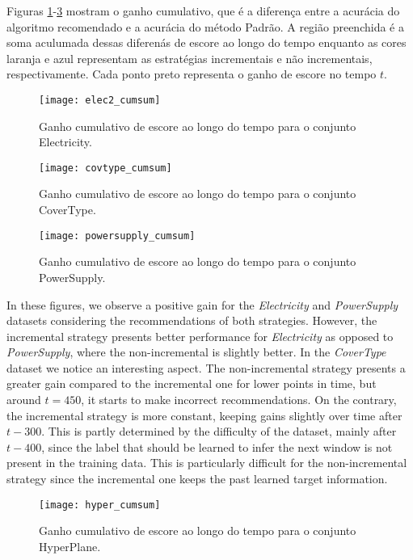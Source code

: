 Figuras \ref{fig:cumsum_elec2}-\ref{fig:cumsum_powersupply} mostram o ganho cumulativo, que é a diferença entre a acurácia do algoritmo recomendado e a acurácia do método Padrão. A região preenchida é a soma aculumada dessas diferenás de escore ao longo do tempo enquanto as cores laranja e azul representam as estratégias incrementais e não incrementais, respectivamente. Cada ponto preto representa o ganho de escore no tempo $t$.

\begin{figure}[!t]
    \centering
    \texttt{[image: elec2\_cumsum]}
    \caption{Ganho cumulativo de escore ao longo do tempo para o conjunto Electricity.}
    \label{fig:cumsum_elec2}
\end{figure}

\begin{figure}[!t]
    \centering
    \texttt{[image: covtype\_cumsum]}
    \caption{Ganho cumulativo de escore ao longo do tempo para o conjunto CoverType.}
    \label{fig:cumsum_covtype}
\end{figure}

\begin{figure}[!t]
    \centering
    \texttt{[image: powersupply\_cumsum]}
    \caption{Ganho cumulativo de escore ao longo do tempo para o conjunto PowerSupply.}
    \label{fig:cumsum_powersupply}
\end{figure}


In these figures, we observe a positive gain for the \textit{Electricity} and \textit{PowerSupply} datasets considering the recommendations of both strategies. However, the incremental strategy presents better performance for \textit{Electricity} as opposed to \textit{PowerSupply}, where the non-incremental is slightly better. In the \textit{CoverType} dataset we notice an interesting aspect. The non-incremental strategy presents a greater gain compared to the incremental one for lower points in time, but around $t=450$, it starts to make incorrect recommendations. On the contrary, the incremental strategy is more constant, keeping gains slightly over time after $t-300$. This is partly determined by the difficulty of the dataset, mainly after $t-400$, since the label that should be learned to infer the next window is not present in the training data.  This is particularly difficult for the non-incremental strategy since the incremental one keeps the past learned target information.


\begin{figure}[!t]
    \centering
    \texttt{[image: hyper\_cumsum]}
    \caption{Ganho cumulativo de escore ao longo do tempo para o conjunto HyperPlane.}
    \label{fig:cumsum_hyper}
\end{figure}

